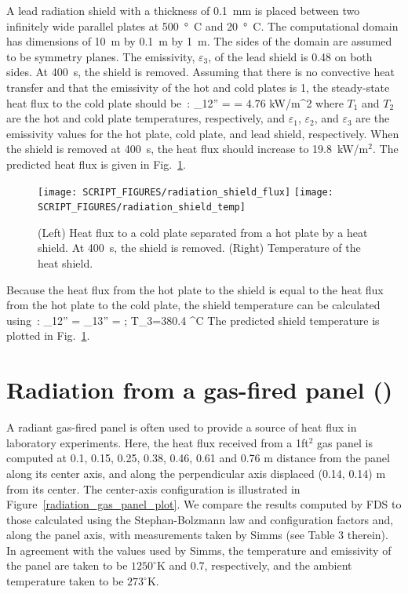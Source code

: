 \documentclass[11pt]{book}
\begin{document}
A lead radiation shield with a thickness of 0.1~mm is placed between two infinitely wide parallel plates at 500~\si{\degree C} and 20~\si{\degree C}.  The computational domain has dimensions of 10~m by 0.1~m by 1~m. The sides of the domain are assumed to be symmetry planes.  The emissivity, $\varepsilon_{3}$, of the lead shield is 0.48 on both sides.  At 400~s, the shield is removed.  Assuming that there is no convective heat transfer and that the emissivity of the hot and cold plates is 1, the steady-state heat flux to the cold plate should be~\cite{Incropera:1}:
\be
   \dq_{12}'' =  = 4.76 \; \hbox{kW/m}^2
\ee
where $T_{1}$ and $T_{2}$ are the hot and cold plate temperatures, respectively, and $\varepsilon_1$, $\varepsilon_2$, and $\varepsilon_3$ are the emissivity values for the hot plate, cold plate, and lead shield, respectively. When the shield is removed at 400~s, the heat flux should increase to 19.8~kW/m$^2$.  The predicted heat flux is given in Fig.~\ref{radiation_shield_plot}.
\begin{figure}[ht]
\texttt{[image: SCRIPT\_FIGURES/radiation\_shield\_flux]}
\texttt{[image: SCRIPT\_FIGURES/radiation\_shield\_temp]}
\caption[The  test case]{(Left) Heat flux to a cold plate separated from a hot plate by a heat shield. At 400~s, the shield is removed. (Right) Temperature of the heat shield.}
\label{radiation_shield_plot}
\end{figure}
Because the heat flux from the hot plate to the shield is equal to the heat flux from the hot plate to the cold plate, the shield temperature can be calculated using~\cite{Incropera:1}:
\be
   \dq_{12}'' = \dq_{13}'' =  \quad ; \quad T_3=380.4 \; ^\circ\hbox{C}
\ee
The predicted shield temperature is plotted in Fig.~\ref{radiation_shield_plot}.

\pagebreak

\section{Radiation from a gas-fired panel (\texorpdfstring{}{radiation\_gas\_panel}) }
\label{radiation_gas_panel}

A radiant gas-fired panel is often used to provide a source of heat flux in
laboratory experiments.  Here, the heat flux received from a 1ft$^2$
gas panel is computed at 0.1, 0.15, 0.25, 0.38, 0.46, 0.61 and 0.76 m
distance from the panel along its center axis, and along the
perpendicular axis displaced (0.14, 0.14) m from its center. The
center-axis configuration is illustrated in
Figure~\ref{radiation_gas_panel_plot}.  We 
compare the results computed by FDS to those calculated using the
Stephan-Bolzmann law and configuration factors and, along the panel
axis, with measurements taken by Simms \cite{Simms:1963} (see Table
3 therein). In agreement with the values used by Simms, the
temperature and emissivity of the panel are taken to be $1250^\circ$K
and 0.7, respectively, and the ambient temperature taken to be
$273^\circ$K.
\end{document}
